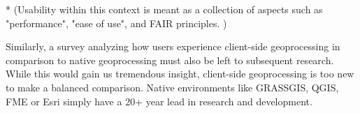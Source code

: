 
* (Usability within this context is meant as a collection of aspects such as "performance", "ease of use", and FAIR principles. )

Similarly, a survey analyzing how users experience client-side geoprocessing in comparison to native geoprocessing must also be left to subsequent research. While this would gain us tremendous insight, client-side geoprocessing is too new to make a balanced comparison. Native environments like GRASSGIS, QGIS, FME or Esri simply have a 20+ year lead in research and development. 














